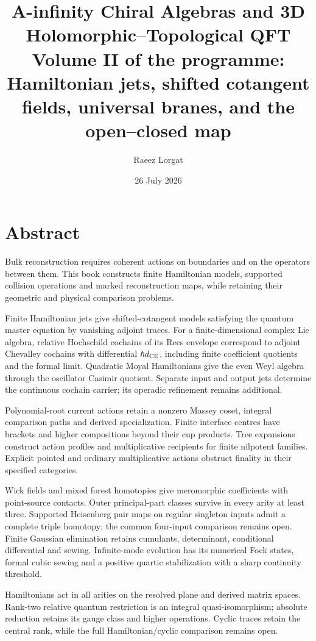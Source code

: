 \documentclass[11pt,twoside,openright]{memoir}
\title{\texorpdfstring{\textbf{A-infinity Chiral Algebras and 3D Holomorphic--Topological QFT}\\[0.55em]\Large Volume II of the programme: Hamiltonian jets, shifted cotangent fields, universal branes, and the open--closed map}{A-infinity Chiral Algebras and 3D Holomorphic--Topological QFT: Volume II of the programme: Hamiltonian jets, shifted cotangent fields, universal branes, and the open--closed map}}
\author{Raeez Lorgat}
\date{26 July 2026}
\begin{document}
\frontmatter
\maketitle
\thispagestyle{empty}
\cleardoublepage
\chapter*{Abstract}

Bulk reconstruction requires coherent actions on boundaries and on the operators between them. This book constructs finite Hamiltonian models, supported collision operations and marked reconstruction maps, while retaining their geometric and physical comparison problems.

Finite Hamiltonian jets give shifted-cotangent models satisfying the quantum master equation by vanishing adjoint traces. For a finite-dimensional complex Lie algebra, relative Hochschild cochains of its Rees envelope correspond to adjoint Chevalley cochains with differential \(\hbar d_{\mathrm{CE}}\), including finite coefficient quotients and the formal limit. Quadratic Moyal Hamiltonians give the even Weyl algebra through the oscillator Casimir quotient. Separate input and output jets determine the continuous cochain carrier; its operadic refinement remains additional.

Polynomial-root current actions retain a nonzero Massey coset, integral comparison paths and derived specialization. Finite interface centres have brackets and higher compositions beyond their cup products. Tree expansions construct action profiles and multiplicative recipients for finite nilpotent families. Explicit pointed and ordinary multiplicative actions obstruct finality in their specified categories.

Wick fields and mixed forest homotopies give meromorphic coefficients with point-source contacts. Outer principal-part classes survive in every arity at least three. Supported Heisenberg pair maps on regular singleton inputs admit a complete triple homotopy; the common four-input comparison remains open. Finite Gaussian elimination retains cumulants, determinant, conditional differential and sewing. Infinite-mode evolution has its numerical Fock states, formal cubic sewing and a positive quartic stabilization with a sharp continuity threshold.

Hamiltonians act in all arities on the resolved plane and derived matrix spaces. Rank-two relative quantum restriction is an integral quasi-isomorphism; absolute reduction retains its gauge class and higher operations. Cyclic traces retain the central rank, while the full Hamiltonian/cyclic comparison remains open.
\end{document}
